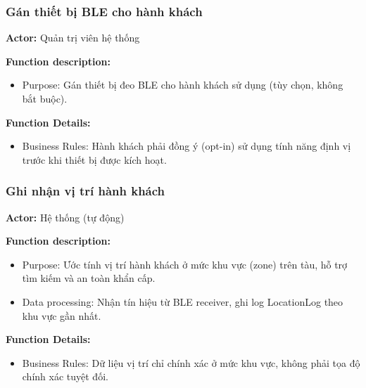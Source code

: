 \subsubsection{Gán thiết bị BLE cho hành khách}

\noindent\textbf{Actor:} Quản trị viên hệ thống

\noindent\textbf{Function description:}
\begin{itemize}
    \item Purpose: Gán thiết bị đeo BLE cho hành khách sử dụng (tùy chọn, không bắt buộc).
\end{itemize}

\noindent\textbf{Function Details:}
\begin{itemize}
    \item Business Rules: Hành khách phải đồng ý (opt-in) sử dụng tính năng định vị trước khi thiết bị được kích hoạt.
\end{itemize}

\subsubsection{Ghi nhận vị trí hành khách}

\noindent\textbf{Actor:} Hệ thống (tự động)

\noindent\textbf{Function description:}
\begin{itemize}
    \item Purpose: Ước tính vị trí hành khách ở mức khu vực (zone) trên tàu, hỗ trợ tìm kiếm và an toàn khẩn cấp.
    \item Data processing: Nhận tín hiệu từ BLE receiver, ghi log LocationLog theo khu vực gần nhất.
\end{itemize}

\noindent\textbf{Function Details:}
\begin{itemize}
    \item Business Rules: Dữ liệu vị trí chỉ chính xác ở mức khu vực, không phải tọa độ chính xác tuyệt đối.
\end{itemize}


